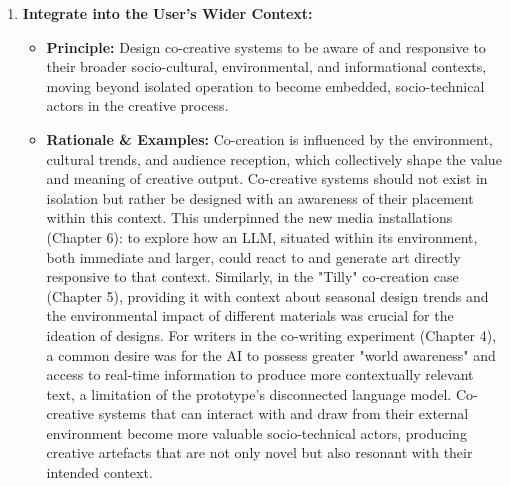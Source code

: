 \begin{enumerate}[label=\arabic*., wide, labelindent=0pt]
\item \textbf{Integrate into the User's Wider Context:}
    \begin{itemize}[label=\textbullet, leftmargin=*]
        \item \textbf{Principle:} Design co-creative systems to be aware of and responsive to their broader socio-cultural, environmental, and informational contexts, moving beyond isolated operation to become embedded, socio-technical actors in the creative process.
        \item \textbf{Rationale \& Examples:} Co-creation is influenced by the environment, cultural trends, and audience reception, which collectively shape the value and meaning of creative output. Co-creative systems should not exist in isolation but rather be designed with an awareness of their placement within this context. This underpinned the new media installations (Chapter 6): to explore how an LLM, situated within its environment, both immediate and larger, could react to and generate art directly responsive to that context. Similarly, in the "Tilly" co-creation case (Chapter 5), providing it with context about seasonal design trends and the environmental impact of different materials was crucial for the ideation of designs. For writers in the co-writing experiment (Chapter 4), a common desire was for the AI to possess greater "world awareness" and access to real-time information to produce more contextually relevant text, a limitation of the prototype's disconnected language model. Co-creative systems that can interact with and draw from their external environment become more valuable socio-technical actors, producing creative artefacts that are not only novel but also resonant with their intended context.
    \end{itemize}


\end{enumerate}
